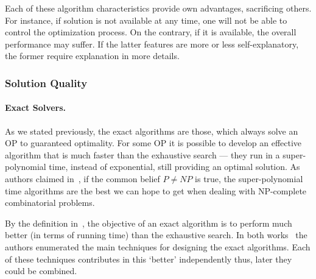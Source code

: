 Each of these algorithm characteristics provide own advantages, sacrificing others. For instance, if solution is not available at any time, one will not be able to control the optimization process. On the contrary, if it is available, the overall performance may suffer. 
If the latter features are more or less self-explanatory, the former require explanation in more details.

\subsubsection{Solution Quality}
\paragraph{Exact Solvers.}
As we stated previously, the exact algorithms are those, which always solve an OP to guaranteed optimality. For some OP it is possible to develop an effective algorithm that is much faster than the exhaustive search — they run in a super-polynomial time, instead of exponential, still providing an optimal solution. As authors claimed in~\cite{woeginger2003exact}, if the common belief $P \ne NP$ is true, the super-polynomial time algorithms are the best we can hope to get when dealing with NP-complete combinatorial problems.

By the definition in~\cite{fomin2013exact}, the objective of an exact algorithm is to perform much better (in terms of running time) than the exhaustive search. In both works~\cite{woeginger2003exact,fomin2013exact} the authors enumerated the main techniques for designing the exact algorithms. Each of these techniques contributes in this `better' independently thus, later they could be combined.

